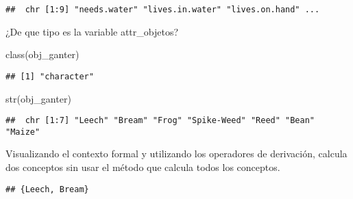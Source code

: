 \documentclass[
]{book}
\newenvironment{Shaded}{\begin{snugshade}}{\end{snugshade}}
\newcommand{\AttributeTok}[1]{\textcolor[rgb]{0.77,0.63,0.00}{#1}}
\newcommand{\DecValTok}[1]{\textcolor[rgb]{0.00,0.00,0.81}{#1}}
\newcommand{\FunctionTok}[1]{\textcolor[rgb]{0.00,0.00,0.00}{#1}}
\newcommand{\NormalTok}[1]{#1}
\newcommand{\OtherTok}[1]{\textcolor[rgb]{0.56,0.35,0.01}{#1}}
\newcommand{\SpecialCharTok}[1]{\textcolor[rgb]{0.00,0.00,0.00}{#1}}
\begin{document}
\begin{verbatim}
##  chr [1:9] "needs.water" "lives.in.water" "lives.on.hand" ...
\end{verbatim}

¿De que tipo es la variable attr\_objetos?

\begin{Shaded}
\begin{Highlighting}[]
\FunctionTok{class}\NormalTok{(obj\_ganter)}
\end{Highlighting}
\end{Shaded}

\begin{verbatim}
## [1] "character"
\end{verbatim}

\begin{Shaded}
\begin{Highlighting}[]
\FunctionTok{str}\NormalTok{(obj\_ganter)}
\end{Highlighting}
\end{Shaded}

\begin{verbatim}
##  chr [1:7] "Leech" "Bream" "Frog" "Spike-Weed" "Reed" "Bean" "Maize"
\end{verbatim}

Visualizando el contexto formal y utilizando los operadores de derivación, calcula dos conceptos sin usar el método que calcula todos los conceptos.

\begin{Shaded}
\end{Shaded}

\begin{verbatim}
## {Leech, Bream}
\end{verbatim}

\begin{Shaded}
\end{Shaded}
\end{document}
